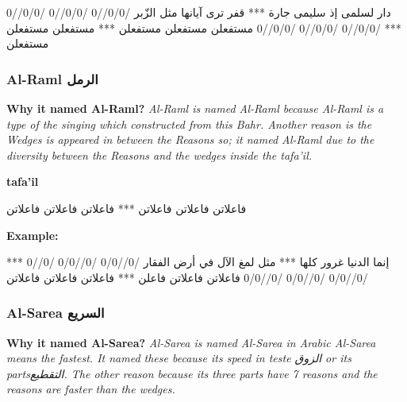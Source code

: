\begin{Arabic}
  \begin{traditionalpoem*}
    دار لسلمى إذ سليمى جارة *** قفر ترى آيانها مثل الزّبر
    /0/0//0 /0/0//0 /0/0//0 *** /0/0//0 /0/0//0 /0/0//0 
مستفعلن مستفعلن مستفعلن *** مستفعلن مستفعلن مستفعلن
          

          
	\end{traditionalpoem*}
      \end{Arabic}
      

\subsubsection{Al-Raml \textarabic{الرمل}}
\textbf{Why it named Al-Raml?}
\textit{Al-Raml is named Al-Raml because Al-Raml is a type of the singing which constructed from this Bahr. Another reason is the Wedges is appeared in between the Reasons so; it named Al-Raml due to the diversity between the Reasons and the wedges inside the tafa'il.}

\textbf{tafa'il}

\begin{Arabic}
  \begin{traditionalpoem*}

    فاعلاتن فاعلاتن فاعلاتن *** فاعلاتن فاعلاتن فاعلاتن
    

	\end{traditionalpoem*}
      \end{Arabic}


\textbf{Example:}

\begin{Arabic}
  \begin{traditionalpoem*}

    إنما الدنيا غرور كلها *** مثل لمغ اﻵل في أرض الفقار
    /0//0/0 /0//0/0 /0//0 *** /0//0/0 /0//0/0 /0//0/0
    فاعلاتن فاعلاتن فاعلن *** فاعلاتن فاعلاتن فاعلاتن

          
	\end{traditionalpoem*}
      \end{Arabic}

      
      

\subsubsection{Al-Sarea \textarabic{السريع}}
\textbf{Why it named Al-Sarea?}
\textit{Al-Sarea is named Al-Sarea in Arabic Al-Sarea means the fastest. It named these because its speed in teste \textarabic{الزوق} or its parts\textarabic{التقطيع}. The other reason because its three parts have 7 reasons and the reasons are faster than the wedges.}

